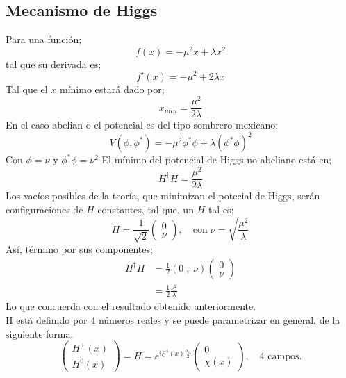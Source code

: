 \documentclass[../main.tex]{subfiles}
\begin{document}
\subsection{Mecanismo de Higgs}
Para una función;
\begin{equation}
  f(x) = -\mu^2x + \lambda x^2
 \end{equation}
 tal que su derivada es;
 \begin{equation}
   f'(x) = -\mu^2 + 2\lambda x
  \end{equation}
Tal que el $x$ mínimo estará dado por;
\begin{equation}
  x_{min} = \frac{\mu^2}{2\lambda}
 \end{equation}
 En el caso abelian o el potencial es del tipo sombrero mexicano;
 \begin{equation}
   V(\phi,\phi^*) = -\mu^2 \phi^* \phi + \lambda \left( \phi^* \phi \right)^2
  \end{equation}
  Con $\phi=\nu$ y $\phi^* \phi= \nu^2$ 
  El mínimo del potencial de Higgs no-abeliano está en;
  \begin{equation}
    H^\dagger H = \frac{\mu^2}{2\lambda}
   \end{equation}
   Los vacíos posibles de la teoría, que minimizan el potecial de Higgs, serán configuraciones de $H$ constantes, tal que, un $H$ tal es;
   \begin{equation}
     H = \frac{1}{\sqrt{2}} \begin{pmatrix}
       0 \\ \nu 
     \end{pmatrix} , \quad \text{con}\; \nu = \sqrt{\frac{\mu^2}{\lambda}}
    \end{equation}
    Así, término por sus componentes;
    \begin{align*}
      H^\dagger H & = \frac{1}{2} (0\; ,\; \nu) \begin{pmatrix}
        0 \\ \nu
      \end{pmatrix} \\
      & = \frac{1}{2}\frac{\nu^2}{\lambda}
    \end{align*}
    Lo que concuerda con el resultado obtenido anteriormente.\\
    H está definido por 4 números reales y se puede parametrizar en general, de la siguiente forma;
    \begin{equation}
      \begin{pmatrix}
        H^+(x) \\ H^0(x)
      \end{pmatrix} = H = e^{i\xi^A(x)\frac{\sigma_A}{2}}\begin{pmatrix}
        0 \\ \chi(x)
      \end{pmatrix}, \quad \text{4 campos.}
     \end{equation}
\end{document}

